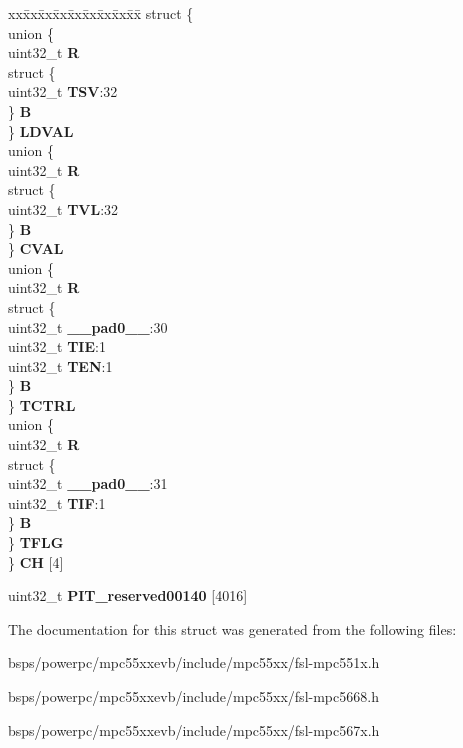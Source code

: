 \begin{DoxyCompactItemize}
\begin{tabbing}
\end{tabbing}\item 
\mbox{\label{structPIT__tag_af41a282eca12c5ffbf68fc2aafec0c1b}} 
\begin{tabbing}
xx\=xx\=xx\=xx\=xx\=xx\=xx\=xx\=xx\=\kill
struct \{\\
\>union \{\\
\>\>uint32\_t {\bfseries R}\\
\>\>struct \{\\
\>\>\>uint32\_t {\bfseries TSV}:32\\
\>\>\} {\bfseries B}\\
\>\} {\bfseries LDVAL}\\
\>union \{\\
\>\>uint32\_t {\bfseries R}\\
\>\>struct \{\\
\>\>\>uint32\_t {\bfseries TVL}:32\\
\>\>\} {\bfseries B}\\
\>\} {\bfseries CVAL}\\
\>union \{\\
\>\>uint32\_t {\bfseries R}\\
\>\>struct \{\\
\>\>\>uint32\_t {\bfseries \_\_pad0\_\_}:30\\
\>\>\>uint32\_t {\bfseries TIE}:1\\
\>\>\>uint32\_t {\bfseries TEN}:1\\
\>\>\} {\bfseries B}\\
\>\} {\bfseries TCTRL}\\
\>union \{\\
\>\>uint32\_t {\bfseries R}\\
\>\>struct \{\\
\>\>\>uint32\_t {\bfseries \_\_pad0\_\_}:31\\
\>\>\>uint32\_t {\bfseries TIF}:1\\
\>\>\} {\bfseries B}\\
\>\} {\bfseries TFLG}\\
\} {\bfseries CH} \mbox{[}4\mbox{]}\\

\end{tabbing}\item 
\mbox{\label{structPIT__tag_afa6cbf9666a05e6301f21cca87b44a6f}} 
uint32\+\_\+t {\bfseries P\+I\+T\+\_\+reserved00140} \mbox{[}4016\mbox{]}
\end{DoxyCompactItemize}


The documentation for this struct was generated from the following files\+:\begin{DoxyCompactItemize}
\item 
bsps/powerpc/mpc55xxevb/include/mpc55xx/fsl-\/mpc551x.\+h\item 
bsps/powerpc/mpc55xxevb/include/mpc55xx/fsl-\/mpc5668.\+h\item 
bsps/powerpc/mpc55xxevb/include/mpc55xx/fsl-\/mpc567x.\+h\end{DoxyCompactItemize}
